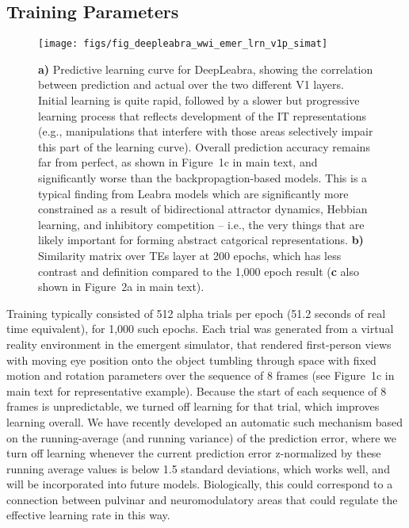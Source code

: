 \documentclass[12pt,twoside]{naturefigs}
\newif\myifpdf
\begin{document}
\subsection{Training Parameters}

\begin{figure}
  \centering\texttt{[image: figs/fig\_deepleabra\_wwi\_emer\_lrn\_v1p\_simat]}
  \caption{{\bf a)} Predictive learning curve for DeepLeabra, showing the correlation between prediction and actual over the two different V1 layers.  Initial learning is quite rapid, followed by a slower but progressive learning process that reflects development of the IT representations (e.g., manipulations that interfere with those areas selectively impair this part of the learning curve).  Overall prediction accuracy remains far from perfect, as shown in Figure~1c in main text, and significantly worse than the backpropagtion-based models.  This is a typical finding from Leabra models which are significantly more constrained as a result of bidirectional attractor dynamics, Hebbian learning, and inhibitory competition -- i.e., the very things that are likely important for forming abstract catgorical representations. {\bf b)} Similarity matrix over TEs layer at 200 epochs, which has less contrast and definition compared to the 1,000 epoch result ({\bf c} also shown in Figure~2a in main text).}
  \label{fig.lrn}
\end{figure}

Training typically consisted of 512 alpha trials per epoch (51.2 seconds of real time equivalent), for 1,000 such epochs. Each trial was generated from a virtual reality environment in the emergent simulator, that rendered first-person views with moving eye position onto the object tumbling through space with fixed motion and rotation parameters over the sequence of 8 frames (see Figure~1c in main text for representative example).  Because the start of each sequence of 8 frames is unpredictable, we turned off learning for that trial, which improves learning overall.  We have recently developed an automatic such mechanism based on the running-average (and running variance) of the prediction error, where we turn off learning whenever the current prediction error z-normalized by these running average values is below 1.5 standard deviations, which works well, and will be incorporated into future models.  Biologically, this could correspond to a connection between pulvinar and neuromodulatory areas that could regulate the effective learning rate in this way.
\end{document}

